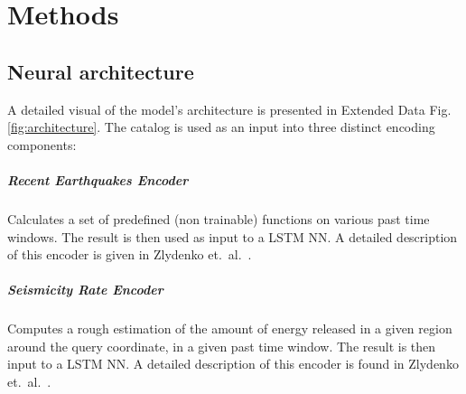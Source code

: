 \documentclass[pdflatex]{sn-jnl}
\begin{document}
\let\oldbibliography\thebibliography
\renewcommand{\thebibliography}[1]{%
  \oldbibliography{#1}%
  \setlength{\itemsep}{10pt}%
}
% 
% 
\newpage


\let\oldthebibliography=\thebibliography
\let\oldendthebibliography=\endthebibliography
\renewenvironment{thebibliography}[1]{
    \oldthebibliography{#1}
    \setcounter{enumiv}{62}
}{\oldendthebibliography}

\newpage
\unnumbered

\unnumbered
\section{Methods}
\subsection{Neural architecture}
A detailed visual of the model's architecture is presented in Extended Data Fig. \ref{fig:architecture}. The catalog is used as an input into three distinct encoding components:
\subparagraph{\textbf{Recent Earthquakes Encoder}} Calculates a set of predefined (non trainable) functions on various past time windows. The result is then used as input to a LSTM NN. A detailed description of this encoder is given in Zlydenko et.~al.~\cite{zlydenko_neural_2023}. 

\subparagraph{\textbf{Seismicity Rate Encoder}} Computes a rough estimation of the amount of energy released in a given region around the query coordinate, in a given past time window. The result is then input to a LSTM NN. A detailed description of this encoder is found in Zlydenko et.~al.~\cite{zlydenko_neural_2023}.
\end{document}
